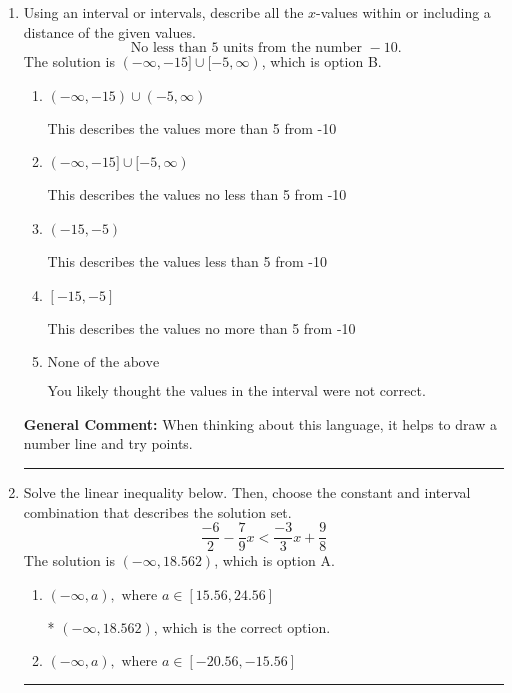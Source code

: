 \documentclass{extbook}[14pt]
\newcommand{\litem}[1]{\item #1

\rule{\textwidth}{0.4pt}}
\begin{document}
\begin{enumerate}
{\begin{enumerate}[label=\Alph*.]
This describes the values no less than 5 from -8
\item \( (-\infty, -13) \cup (-3, \infty) \)

This describes the values more than 5 from -8
\item \( (-13, -3) \)

This describes the values less than 5 from -8
\item \( \text{None of the above} \)

You likely thought the values in the interval were not correct.
\end{enumerate}

\textbf{General Comment:} When thinking about this language, it helps to draw a number line and try points.
}
\litem{
Using an interval or intervals, describe all the $x$-values within or including a distance of the given values.
\[ \text{ No less than } 5 \text{ units from the number } -10. \]The solution is \( (-\infty, -15] \cup [-5, \infty) \), which is option B.\begin{enumerate}[label=\Alph*.]
\item \( (-\infty, -15) \cup (-5, \infty) \)

This describes the values more than 5 from -10
\item \( (-\infty, -15] \cup [-5, \infty) \)

This describes the values no less than 5 from -10
\item \( (-15, -5) \)

This describes the values less than 5 from -10
\item \( [-15, -5] \)

This describes the values no more than 5 from -10
\item \( \text{None of the above} \)

You likely thought the values in the interval were not correct.
\end{enumerate}

\textbf{General Comment:} When thinking about this language, it helps to draw a number line and try points.
}
\litem{
Solve the linear inequality below. Then, choose the constant and interval combination that describes the solution set.
\[ \frac{-6}{2} - \frac{7}{9} x < \frac{-3}{3} x + \frac{9}{8} \]The solution is \( (-\infty, 18.562) \), which is option A.\begin{enumerate}[label=\Alph*.]
\item \( (-\infty, a), \text{ where } a \in [15.56, 24.56] \)

* $(-\infty, 18.562)$, which is the correct option.
\item \( (-\infty, a), \text{ where } a \in [-20.56, -15.56] \)


\end{enumerate}}
\end{enumerate}
\end{document}
